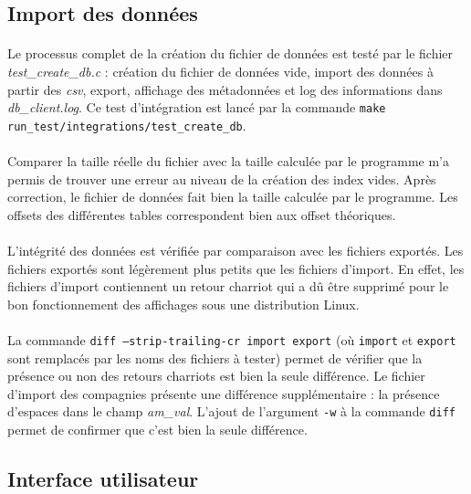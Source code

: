 \documentclass{article}
\begin{document}
    \subsection{Import des données}
    \paragraph{}
    Le processus complet de la création du fichier de données est testé par le fichier \emph{test\_create\_db.c} : création du fichier de données vide, import des données à partir des \emph{csv}, export, affichage des métadonnées et log des informations dans \emph{db\_client.log}. Ce test d'intégration est lancé par la commande \texttt{make run\_test/integrations/test\_create\_db}.

    \paragraph{}
    Comparer la taille réelle du fichier avec la taille calculée par le programme m'a permis de trouver une erreur au niveau de la création des index vides. Après correction, le fichier de données fait bien la taille calculée par le programme. Les offsets des différentes tables correspondent bien aux offset théoriques.

    \paragraph{}
    L'intégrité des données est vérifiée par comparaison avec les fichiers exportés. Les fichiers exportés sont légèrement plus petits que les fichiers d'import. En effet, les fichiers d'import contiennent un retour charriot qui a dû être supprimé pour le bon fonctionnement des affichages sous une distribution Linux.

    \paragraph{}
    La commande \texttt{diff --strip-trailing-cr import export} (où \texttt{import} et \texttt{export} sont remplacés par les noms des fichiers à tester) permet de vérifier que la présence ou non des retours charriots est bien la seule différence. Le fichier d'import des compagnies présente une différence supplémentaire : la présence d'espaces dans le champ \emph{am\_val}. L'ajout de l'argument \texttt{-w} à la commande \texttt{diff} permet de confirmer que c'est bien la seule différence.


    \subsection{Interface utilisateur}
\end{document}
